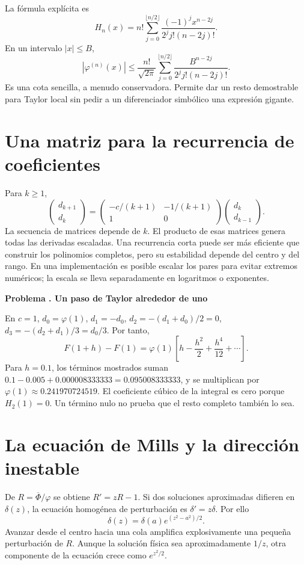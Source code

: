 \documentclass[11pt,a4paper]{article}
\theoremstyle{definition}
\newcounter{problema}
\newenvironment{resuelto}[1]{\refstepcounter{problema}\par\medskip\Needspace{6\baselineskip}\textbf{Problema \theproblema. #1}\par}{\par\medskip}
\newcommand{\SF}{\overline\Phi}
\begin{document}
La fórmula explícita es
\[
H_n(x)=n!\sum_{j=0}^{\lfloor n/2\rfloor}
\frac{(-1)^j x^{n-2j}}{2^j j!(n-2j)!}.
\]
En un intervalo $|x|\le B$,
\[
|\varphi^{(n)}(x)|
\le\frac{n!}{\sqrt{2\pi}}
\sum_{j=0}^{\lfloor n/2\rfloor}
\frac{B^{n-2j}}{2^j j!(n-2j)!}.
\]
Es una cota sencilla, a menudo conservadora. Permite dar un resto demostrable para Taylor local sin pedir a un diferenciador simbólico una expresión gigante.

\section{Una matriz para la recurrencia de coeficientes}
Para $k\ge1$,
\[
\begin{pmatrix}d_{k+1}\\d_k\end{pmatrix}
=
\begin{pmatrix}-c/(k+1)&-1/(k+1)\\1&0\end{pmatrix}
\begin{pmatrix}d_k\\d_{k-1}\end{pmatrix}.
\]
La secuencia de matrices depende de $k$.
El producto de esas matrices genera todas las derivadas escaladas.
Una recurrencia corta puede ser más eficiente que construir los polinomios completos, pero su estabilidad depende del centro y del rango.
En una implementación es posible escalar los pares para evitar extremos numéricos; la escala se lleva separadamente en logaritmos o exponentes.

\begin{resuelto}{Un paso de Taylor alrededor de uno}
En $c=1$, $d_0=\varphi(1)$, $d_1=-d_0$,
$d_2=-(d_1+d_0)/2=0$,
$d_3=-(d_2+d_1)/3=d_0/3$.
Por tanto,
\[
F(1+h)-F(1)=\varphi(1)
\left[h-\frac{h^2}{2}+\frac{h^4}{12}+\cdots\right].
\]
Para $h=0.1$, los términos mostrados suman
$0.1-0.005+0.000008333333=0.095008333333$,
y se multiplican por $\varphi(1)\approx0.241970724519$.
El coeficiente cúbico de la integral es cero porque $H_2(1)=0$.
Un término nulo no prueba que el resto completo también lo sea.
\end{resuelto}

\section{La ecuación de Mills y la dirección inestable}
De $R=\SF/\varphi$ se obtiene
$R'=zR-1$.
Si dos soluciones aproximadas difieren en $\delta(z)$, la ecuación homogénea de perturbación es
$\delta'=z\delta$.
Por ello
\[
\delta(z)=\delta(a)e^{(z^2-a^2)/2}.
\]
Avanzar desde el centro hacia una cola amplifica explosivamente una pequeña perturbación de $R$.
Aunque la solución física sea aproximadamente $1/z$, otra componente de la ecuación crece como $e^{z^2/2}$.
\end{document}
